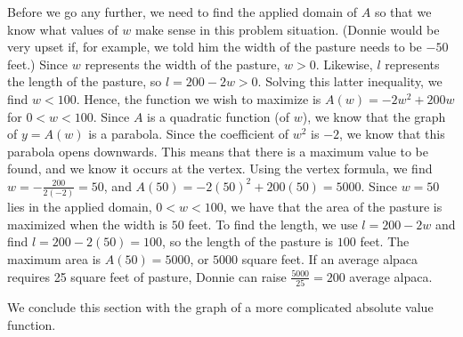 {Before we go any further, we need to find the applied domain of $A$ so that we know what values of $w$ make sense in this problem situation. (Donnie would be very upset if, for example, we told him the width of the pasture needs to be $-50$ feet.)  Since $w$ represents the width of the pasture, $w > 0$.  Likewise, $l$ represents the length of the pasture, so $l = 200-2w > 0$.  Solving this latter inequality, we find $w < 100$.  Hence, the function we wish to maximize is $A(w) = -2w^2 + 200w$ for $0 < w < 100$.  Since $A$ is a quadratic function (of $w$), we know that the graph of $y = A(w)$ is a parabola.  Since the coefficient of $w^2$ is $-2$, we know that this parabola opens downwards.  This means that there is a maximum value to be found, and we know it occurs at the vertex.  Using the vertex formula, we find $w = -\frac{200}{2(-2)} = 50$, and $A(50) = -2(50)^2 + 200(50) = 5000$.  Since $w=50$ lies in the applied domain, $0 < w < 100$, we have that the area of the pasture is maximized when the width is $50$ feet.  To find the length, we use $l = 200-2w$ and find $l = 200-2(50) = 100$, so the length of the pasture is $100$ feet.  The maximum area is $A(50) = 5000$, or $5000$ square feet.  If an average alpaca requires 25 square feet of pasture, Donnie can raise $\frac{5000}{25} = 200$ average alpaca. 
}

\medskip

We conclude this section with the graph of a more complicated absolute value function.

\medskip

